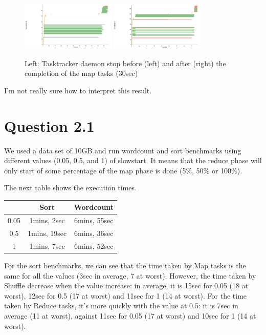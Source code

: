\documentclass{article}
\begin{document}
\begin{figure}%
  \centering
  \includegraphics[width=0.4\textwidth]{expiry30before.png}
  \includegraphics[width=0.4\textwidth]{expiry30after.png}
  \caption{Left: Tasktracker daemon stop before (left) and after (right) the completion of the map tasks (30sec)}
  \label{kill}
\end{figure}




I'm not really sure how to interpret this result.

\section*{Question 2.1}


We used a data set of 10GB and run wordcount and sort benchmarks using
different values (0.05, 0.5, and 1) of slowstart.
It means that the reduce phase will only start of some percentage of the map phase is done (5\%, 50\% or 100\%).

The next table shows the execution times.

\begin{center}
\begin{tabular}{|c|c|c|}
\hline
\ & Sort & Wordcount \\
\hline
0.05 & 1mins, 2sec & 6mins, 55sec \\
\hline
0.5 & 1mins, 19sec & 6mins, 36sec \\
\hline
1 & 1mins, 7sec & 6mins, 52sec \\
\hline
\end{tabular}
\end{center}

For the sort benchmarks, we can see that the time taken by Map tasks is the same for all the values (3sec in average, 7 at worst).
However, the time taken by Shuffle decrease when the value increase: in average, it is 15sec for 0.05 (18 at worst), 12sec for 0.5 (17 at worst) and 11sec for 1 (14 at worst). For the time taken by Reduce tasks, it's more quickly with the value at 0.5: it is 7sec in average (11 at worst), against 11sec for 0.05 (17 at worst) and 10sec for 1 (14 at worst).
\end{document}
